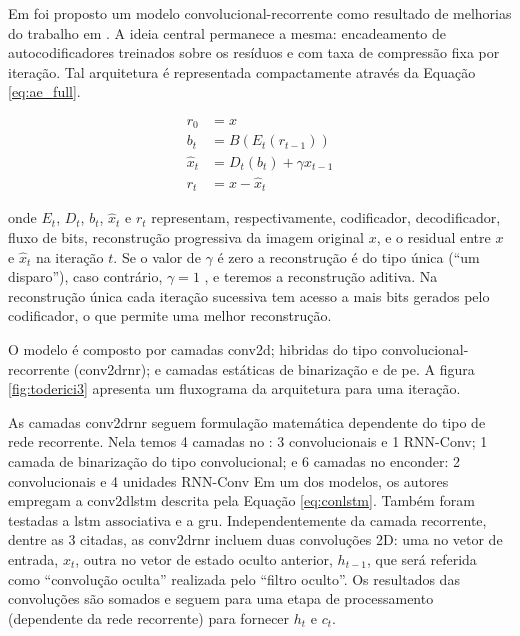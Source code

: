 Em \cite{FullResolution2017Toderici} foi proposto um modelo convolucional-recorrente como resultado de melhorias do trabalho em \cite {Variable2016Toderici}. A ideia central permanece a mesma: encadeamento de autocodificadores treinados sobre os resíduos e com taxa de compressão fixa por iteração.  Tal arquitetura é representada compactamente através da Equação \ref{eq:ae_full}. 

\begin{equation}
\label{eq:ae_full}
\begin{aligned}
r_{0} &=x\\
b_{t} &= B(E_{t}(r_{t-1})) \\
\hat{x}_{t} &= D_{t}(b_{t}) + \gamma \hat{x}_{t-1} \\
r_{t} &= x- \hat{x}_{t}
\end{aligned}
\end{equation}

onde $E_t$, $D_t$, $b_t$, $\hat{x}_t$ e $r_t$ representam, respectivamente, codificador, decodificador, fluxo de bits, reconstrução progressiva da imagem original $x$, e o residual entre $x$ e $\hat{x}_t$ na iteração $t$. Se o valor de $\gamma$ é zero a reconstrução é do tipo única (``um disparo''), caso contrário, $\gamma = 1$ , e teremos a reconstrução aditiva. Na reconstrução única cada iteração sucessiva tem acesso a mais bits gerados pelo codificador, o que permite uma melhor reconstrução. 


O modelo é composto por camadas \acrshort{conv2d}; hibridas do tipo convolucional-recorrente (\acrshort{conv2drnr}); e camadas estáticas de binarização e de \gls{pe}. A figura \ref{fig:toderici3} apresenta um fluxograma da arquitetura para uma iteração. 





As camadas \acrshort{conv2drnr} seguem formulação matemática dependente do tipo de rede recorrente.  Nela temos 4 camadas no : 3 convolucionais e 1 RNN-Conv; 1 camada de binarização do tipo convolucional; e 6 camadas no enconder: 2 convolucionais e 4 unidades RNN-Conv
Em um dos modelos, os autores empregam a \acrshort{conv2dlstm} descrita pela Equação \ref{eq:conlstm}. Também foram testadas a \acrshort{lstm} associativa e a \gls{gru}.
Independentemente da camada recorrente, dentre as 3 citadas, as \acrshort{conv2drnr} incluem duas convoluções 2D: uma no vetor de entrada, $x_t$, outra no vetor de estado oculto anterior, $h_{t-1}$, que será referida como ``convolução oculta'' realizada pelo  ``filtro oculto''. Os resultados das convoluções são somados e seguem para uma etapa de processamento (dependente da rede recorrente) para fornecer $h_t$ e $c_t$.

